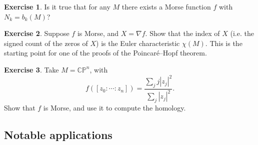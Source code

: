 \documentclass{article}
\theoremstyle{definition}
\newtheorem*{exercise}{Exercise}
\newcommand{\CP}{\mathbb{CP}}
\begin{document}
\begin{exercise}
    Is it true that for any $M$ there exists a Morse function $f$ with
    $N_k=b_k(M)$?
\end{exercise}

\begin{exercise}
    Suppose $f$ is Morse, and $X=\nabla f$. Show that the index of $X$
    (i.e. the signed count of the zeros of $X$) is the Euler characteristic
    $\chi(M)$. This is the starting point for one of the proofs of the
    Poincar\'e--Hopf theorem.
\end{exercise}

\begin{exercise}
    Take $M=\CP^n$, with
    \begin{equation*}
        f([z_0:\cdots:z_n]) = \frac{\sum_jj|z_j|^2}{\sum_j|z_j|^2}.
    \end{equation*}
    Show that $f$ is Morse, and use it to compute the homology.
\end{exercise}

\subsection*{Notable applications}
\end{document}

